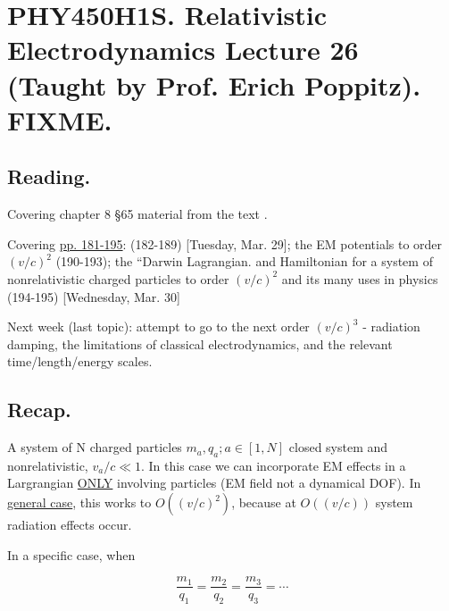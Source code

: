 
%

\chapter{PHY450H1S.  Relativistic Electrodynamics Lecture 26 (Taught by Prof. Erich Poppitz).  FIXME.}
\label{chap:relativisticElectrodynamicsL26}
{}
\date{April 5, 2011}

\beginArtNoToc

\section{Reading.}

Covering chapter 8 \S 65 material from the text \cite{landau1980classical}.

Covering \href{http://www.physics.utoronto.ca/~poppitz/epoppitz/PHY450_files/RelEMpp181-195.pdf}{pp. 181-195}: (182-189) [Tuesday, Mar. 29]; the EM potentials to order $(v/c)^2$ (190-193); the ``Darwin Lagrangian.  and Hamiltonian for a system of nonrelativistic charged particles to order $(v/c)^2$ and its many uses in physics (194-195) [Wednesday, Mar. 30]

Next week (last topic): attempt to go to the next order $(v/c)^3$ - radiation damping, the limitations of classical electrodynamics, and the relevant time/length/energy scales.

\section{Recap.}

A system of N charged particles $m_a, q_a ; a \in [1, N]$ closed system and nonrelativistic, $v_a/c \ll 1$.  In this case we can incorporate EM effects in a Largrangian \underline{ONLY} involving particles (EM field not a dynamical DOF).  In \underline{general case}, this works to $O((v/c)^2)$, because at $O((v/c))$ system radiation effects occur.

In a specific case, when
 
\begin{equation}\label{eqn:relativisticElectrodynamicsL26:10}
\frac{m_1}{q_1} = \frac{m_2}{q_2} = \frac{m_3}{q_3} = \cdots
\end{equation}

